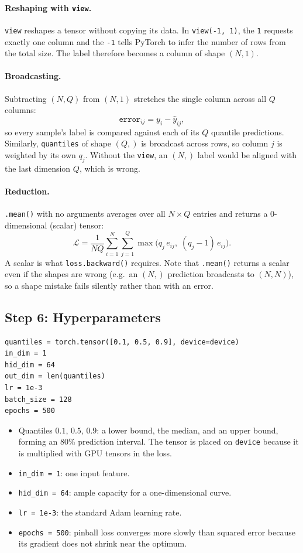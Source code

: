 \documentclass[11pt]{article}
\begin{document}
\paragraph{Reshaping with \texttt{view}.}
\texttt{view} reshapes a tensor without copying its data. In
\texttt{view(-1, 1)}, the \texttt{1} requests exactly one column and the
\texttt{-1} tells PyTorch to infer the number of rows from the total size.
The label therefore becomes a column of shape $(N, 1)$.

\paragraph{Broadcasting.}
Subtracting $(N, Q)$ from $(N, 1)$ stretches the single column across all
$Q$ columns:
\[
  \texttt{error}_{ij} = y_i - \hat y_{ij},
\]
so every sample's label is compared against each of its $Q$ quantile
predictions. Similarly, \texttt{quantiles} of shape $(Q,)$ is broadcast across
rows, so column $j$ is weighted by its own $q_j$. Without the \texttt{view},
an $(N,)$ label would be aligned with the last dimension $Q$, which is wrong.

\paragraph{Reduction.}
\texttt{.mean()} with no arguments averages over all $N \times Q$ entries and
returns a 0-dimensional (scalar) tensor:
\[
  \mathcal{L} = \frac{1}{NQ}\sum_{i=1}^{N}\sum_{j=1}^{Q}
  \max\big(q_j\, e_{ij},\; (q_j - 1)\, e_{ij}\big).
\]
A scalar is what \texttt{loss.backward()} requires. Note that \texttt{.mean()}
returns a scalar even if the shapes are wrong (e.g.\ an $(N,)$ prediction
broadcasts to $(N, N)$), so a shape mistake fails silently rather than with an
error.

\subsection{Step 6: Hyperparameters}

\begin{lstlisting}
quantiles = torch.tensor([0.1, 0.5, 0.9], device=device)
in_dim = 1
hid_dim = 64
out_dim = len(quantiles)
lr = 1e-3
batch_size = 128
epochs = 500
\end{lstlisting}

\begin{itemize}
  \item Quantiles $0.1$, $0.5$, $0.9$: a lower bound, the median, and an upper
        bound, forming an 80\% prediction interval. The tensor is placed on
        \texttt{device} because it is multiplied with GPU tensors in the loss.
  \item \texttt{in\_dim = 1}: one input feature.
  \item \texttt{hid\_dim = 64}: ample capacity for a one-dimensional curve.
  \item \texttt{lr = 1e-3}: the standard Adam learning rate.
  \item \texttt{epochs = 500}: pinball loss converges more slowly than squared
        error because its gradient does not shrink near the optimum.
\end{itemize}
\end{document}
